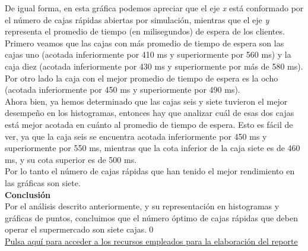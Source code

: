 \documentclass[letterpaper,11pt]{article}
\begin{document}
De igual forma, en esta gráfica podemos apreciar que el eje \textit{x} está conformado por el número de cajas rápidas abiertas por simulación, mientras que el eje \textit{y} representa el promedio de tiempo (en milisegundos) de espera de los clientes.\\Primero veamos que las cajas con más promedio de tiempo de espera son las cajas uno (acotada inferiormente por 410 ms y superiormente por 560 ms) y la caja diez (acotada inferiormente por 430 ms y superiormente por más de 580 ms). Por otro lado la caja con el mejor promedio de tiempo de espera es la ocho (acotada inferiormente por 450 ms y superiormente por 490 ms).\\Ahora bien, ya hemos determinado que las cajas seis y siete tuvieron el mejor desempeño en los histogramas, entonces hay que analizar cuál de esas dos cajas está mejor acotada en cuánto al promedio de tiempo de espera. Esto es fácil de ver, ya que la caja seis se encuentra acotada inferiormente por 450 ms y superiormente por 550 ms, mientras que la cota inferior de la caja siete es de 460 ms, y su cota superior es de 500 ms.\\ Por lo tanto el número de cajas rápidas que han tenido el mejor rendimiento en las gráficas son siete.\\

\textbf{Conclusión}\\

Por el análisis descrito anteriormente, y su representación en histogramas y gráficas de puntos, concluimos que el número óptimo de cajas rápidas que deben operar el supermercado son siete cajas.\qed\\

\href{https://drive.google.com/drive/folders/1razQHfkaCekMu2o-5wroSP_411UXS1QN?usp=sharing}{Pulsa aquí para acceder a los recursos empleados para la elaboración del reporte}
 
\end{document}
